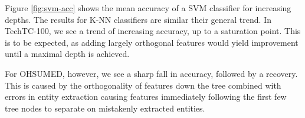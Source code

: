 \documentclass[twoside,11pt]{article}
\theoremstyle{definition}
\begin{document}
Figure \ref{fig:svm-acc} shows the mean accuracy of a SVM classifier for increasing depths. The results for K-NN classifiers are similar their general trend. In TechTC-100, we see a trend of increasing accuracy, up to a saturation point. This is to be expected, as adding largely orthogonal features would yield improvement until a maximal depth is achieved.

For OHSUMED, however, we see a sharp fall in accuracy, followed by a recovery. 
This is caused by the orthogonality of features down the tree combined with errors in entity extraction causing features immediately following the first few tree nodes to separate on mistakenly extracted entities.




\end{document}
